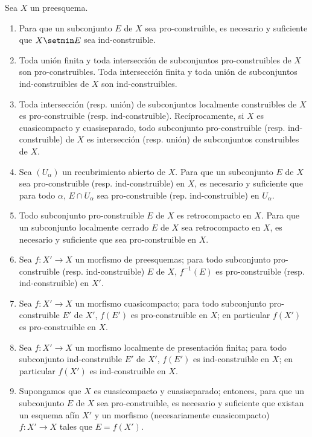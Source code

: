 \begin{proposition}[1.9.5]
\label{IV.1.9.5-fr}
Sea $X$ un preesquema.
\begin{enumerate}
  \item[\textup{(i)}] Para que un subconjunto $E$ de $X$ sea pro-construible, es necesario y
  suficiente que $X\setmin E$ sea ind-construible.
  \item[\textup{(ii)}] Toda unión finita y toda intersección de subconjuntos
  pro-construibles de $X$ son pro-construibles. Toda intersección
  finita y toda unión de subconjuntos ind-construibles de $X$ son
  ind-construibles.
  \item[\textup{(iii)}] Toda intersección \textup{(resp.} unión\textup{)} de subconjuntos localmente
  construibles de $X$ es pro-construible \textup{(resp.} ind-construible\textup{)}.
  Recíprocamente, si $X$ es cuasicompacto y cuasiseparado, todo subconjunto
  pro-construible \textup{(resp.} ind-construible\textup{)} de $X$ es intersección \textup{(resp.}
  unión\textup{)} de subconjuntos construibles de $X$.
  \item[\textup{(iv)}] Sea $(U_\alpha)$ un recubrimiento abierto de $X$. Para que un
  subconjunto $E$ de $X$ sea pro-construible \textup{(resp.} ind-construible\textup{)} en
  $X$, es necesario y suficiente que para todo $\alpha$, $E\cap U_\alpha$ sea
  pro-construible \textup{(rep.} ind-construible\textup{)} en $U_\alpha$.
  \item[\textup{(v)}] Todo subconjunto pro-construible $E$ de $X$ es retrocompacto
  en $X$. Para que un subconjunto localmente cerrado $E$ de $X$ sea
  retrocompacto en $X$, es necesario y suficiente que sea
  pro-construible en $X$.
  \item[\textup{(vi)}] Sea $f:X'\to X$ un morfismo de preesquemas; para todo subconjunto
  pro-construible \textup{(resp.} ind-construible\textup{)} $E$ de $X$, $f^{-1}(E)$ es
  pro-construible \textup{(resp.} ind-construible\textup{)} en $X'$.
  \item[\textup{(vii)}] Sea $f:X'\to X$ un morfismo cuasicompacto; para todo
  subconjunto pro-construible $E'$ de $X'$, $f(E')$ es pro-construible en
  $X$; en particular $f(X')$ es pro-construible en $X$.
  \item[\textup{(viii)}] Sea $f:X'\to X$ un morfismo localmente de presentación
  finita; para todo subconjunto ind-construible $E'$ de $X'$, $f(E')$ es
  ind-construible en $X$; en particular $f(X')$ es ind-construible
  en $X$.
  \item[\textup{(ix)}] Supongamos que $X$ es cuasicompacto y cuasiseparado; entonces,
  para que un subconjunto $E$ de $X$ sea pro-construible, es necesario y suficiente
  que existan un esquema afín $X'$ y un morfismo (necesariamente
  cuasicompacto) $f:X'\to X$ tales que $E=f(X')$.
\end{enumerate}
\end{proposition}

